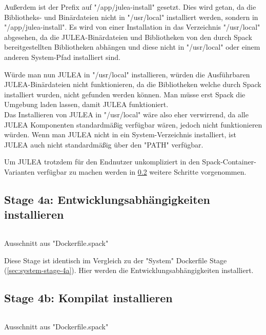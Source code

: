 Außerdem ist der Prefix auf "/app/julea-install" gesetzt. Dies wird getan, da die Bibliotheks- und Binärdateien nicht in "/usr/local" installiert werden, sondern in "/app/julea-install". Es wird von einer Installation in das Verzeichnis "/usr/local" abgesehen, da die JULEA-Binärdateien und Bibliotheken von den durch Spack bereitgestellten Bibliotheken abhängen und diese nicht in "/usr/local" oder einem anderen System-Pfad installiert sind. 

Würde man nun JULEA in "/usr/local" installieren, würden die Ausführbaren JULEA-Binärdateien nicht funktionieren, da die Bibliotheken welche durch Spack installiert wurden, nicht gefunden werden können. Man müsse erst Spack die Umgebung laden lassen, damit JULEA funktioniert. \\
Das Installieren von JULEA in "/usr/local" wäre also eher verwirrend, da alle JULEA Komponenten standardmäßig verfügbar wären, jedoch nicht funktionieren würden. Wenn man JULEA nicht in ein System-Verzeichnis installiert, ist JULEA auch nicht standardmäßig über den "PATH" verfügbar. 

Um JULEA trotzdem für den Endnutzer unkompliziert in den Spack-Container-Varianten verfügbar zu machen werden in \cref{sec:spack-stage-4b} weitere Schritte vorgenommen.

\subsection{Stage 4a: Entwicklungsabhängigkeiten installieren}

\begin{listing}[H]
\inputminted[firstline=51,lastline=55]{dockerfile}{./code-examples/Dockerfile.spack}
\caption{Ausschnitt aus "Dockerfile.spack"}
\end{listing}

Diese Stage ist identisch im Vergleich zu der "System" Dockerfile Stage (\cref{sec:system-stage-4a}). Hier werden die Entwicklungsabhängigkeiten installiert.

\subsection{Stage 4b: Kompilat installieren} \label{sec:spack-stage-4b}

\begin{listing}[H]
\inputminted[firstline=42,lastline=48]{dockerfile}{./code-examples/Dockerfile.spack}
\caption{Ausschnitt aus "Dockerfile.spack"}
\end{listing}


